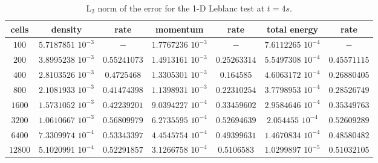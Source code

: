 \documentclass[preprint,10pt]{elsarticle}
\begin{document}
\begin{table}[!htbp]
\begin{center}
 \caption{\label{tbl:l2_norm_leblanc} L$_2$ norm of the error for the 1-D Leblanc test at $t=4s$.}
 \begin{tabular}{|c|c|c|c|c|c|c|}
 \hline
   cells & density & rate & momentum & rate & total energy & rate \\ \hline
$100$ &   $5.7187851$ $10^{-3}$ & $-$ & $1.7767236$ $10^{-3}$ & $-$ & $7.6112265$  $10^{-4}$& $-$\\   \hline
$200$  &  $3.8995238$ $10^{-3}$ & $0.55241073$ & $1.4913161$ $10^{-3}$ & $0.25263314$ &  $5.5497308$ $10^{-4}$& $0.45571115$\\ \hline
$400$ & $2.8103526$ $10^{-3}$   & $0.4725468$ & $1.3305301$ $10^{-3}$ & $0.164585$ & $4.6063172$ $10^{-4}$ & $0.26880405$\\ \hline
$800$ & $2.1081933$ $10^{-3}$   & $0.41474398$ & $1.1398931$ $10^{-3}$ & $0.22310254$ & $3.7798953$ $10^{-4}$ & $0.28526749$\\ \hline
$1600$ & $1.5731052$ $10^{-3}$  & $0.42239201$ & $9.0394227$ $10^{-4}$ & $0.33459602$ & $2.9584646$ $10^{-4}$ & $0.35349763$\\ \hline
$3200$&$1.0610667$ $10^{-3}$    & $0.56809979$ & $6.2735595$ $10^{-4}$ & $0.52694639$ & $2.054455$ $10^{-4}$ & $0.52609289$\\ \hline
$6400$&$7.3309974$ $10^{-4}$    & $0.53343397$ & $4.4545754$ $10^{-4}$ & $0.49399631$ & $1.4670834$ $10^{-4}$ & $0.48580482$\\ \hline
 $12800$&$5.1020991$ $10^{-4}$  & $0.52291857$ & $3.1266758$ $10^{-4}$ & $0.5106583$ & $1.0299897$ $10^{-5}$ & $0.51032105$\\  \hline
\end{tabular}
\end{center}
\nonumber
\end{table}

\end{document}
